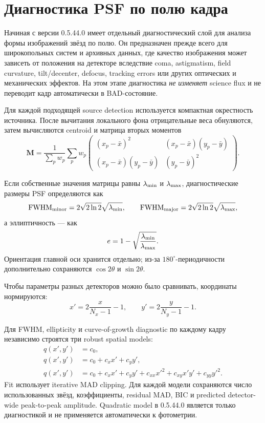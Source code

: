 \section{Диагностика PSF по полю кадра}
\label{sec:psf-field-diagnostics}

Начиная с версии 0.5.44.0 \program{} имеет отдельный диагностический слой для анализа формы
изображений звёзд по полю. Он предназначен прежде всего для широкопольных систем и архивных
данных, где качество изображения может зависеть от положения на детекторе вследствие coma,
astigmatism, field curvature, tilt/decenter, defocus, tracking errors или других оптических и
механических эффектов. На этом этапе диагностика \emph{не изменяет} science flux и не переводит
кадр автоматически в BAD-состояние.

Для каждой подходящей source detection используется компактная окрестность источника. После
вычитания локального фона отрицательные веса обнуляются, затем вычисляются centroid и матрица
вторых моментов
\begin{equation}
  \mathbf{M}=
  \frac{1}{\sum_p w_p}
  \sum_p w_p
  \begin{pmatrix}
    (x_p-\bar{x})^2 & (x_p-\bar{x})(y_p-\bar{y})\\
    (x_p-\bar{x})(y_p-\bar{y}) & (y_p-\bar{y})^2
  \end{pmatrix}.
\end{equation}

Если собственные значения матрицы равны $\lambda_{\rm min}$ и $\lambda_{\rm max}$, диагностические
размеры PSF определяются как
\begin{equation}
  {\rm FWHM}_{\rm minor}=2\sqrt{2\ln2}\sqrt{\lambda_{\rm min}},\qquad
  {\rm FWHM}_{\rm major}=2\sqrt{2\ln2}\sqrt{\lambda_{\rm max}},
\end{equation}
а эллиптичность --- как
\begin{equation}
  e=1-\sqrt{\frac{\lambda_{\rm min}}{\lambda_{\rm max}}}.
\end{equation}
Ориентация главной оси хранится отдельно; из-за $180^\circ$-периодичности дополнительно
сохраняются $\cos 2\theta$ и $\sin 2\theta$.

Чтобы параметры разных детекторов можно было сравнивать, координаты нормируются:
\begin{equation}
  x'=2\frac{x}{N_x-1}-1,\qquad
  y'=2\frac{y}{N_y-1}-1.
\end{equation}

Для FWHM, ellipticity и curve-of-growth diagnostic по каждому кадру независимо строятся три
robust spatial models:
\begin{align}
  q(x',y') &= c_0,\\
  q(x',y') &= c_0+c_xx'+c_yy',\\
  q(x',y') &= c_0+c_xx'+c_yy'+c_{xx}x'^2+c_{xy}x'y'+c_{yy}y'^2.
\end{align}
Fit использует iterative MAD clipping. Для каждой модели сохраняются число использованных
звёзд, коэффициенты, residual MAD, BIC и predicted detector-wide peak-to-peak amplitude.
Quadratic model в 0.5.44.0 является только диагностикой и не применяется автоматически к
фотометрии.

